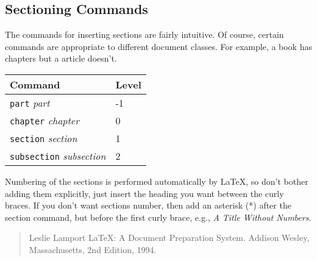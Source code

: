\documentclass{article}
\begin{document}
\subsection{Sectioning Commands}
The commands for inserting sections are fairly intuitive.  Of course,
certain commands are appropriate to different document classes.
For example, a book has chapters but a article doesn't.

\begin{center}
	\begin{tabular}{| l | l |} 

		\hline  %
		Command & Level \\ \hline  %
		\texttt{part} \emph{part} & -1 \\
		\texttt{chapter} \emph{chapter} & 0 \\
		\texttt{section} \emph{section} & 1 \\
		\texttt{subsection} \emph{subsection} & 2 \\
		\hline
	\end{tabular}
\end{center}

Numbering of the sections is performed automatically by \LaTeX{}, so don't
bother adding them explicitly, just insert the heading you want between
the curly braces.  If you don't want sections number, then add an asterisk (*) after the
section command, but before the first curly brace, e.g., \textit{A Title Without Numbers}.

\begin{quotation}
	Leslie Lamport
	LaTeX: A Document Preparation System.
	  Addison Wesley, Massachusetts,
	  2nd Edition,
	  1994.
\end{quotation} %
\end{document}
